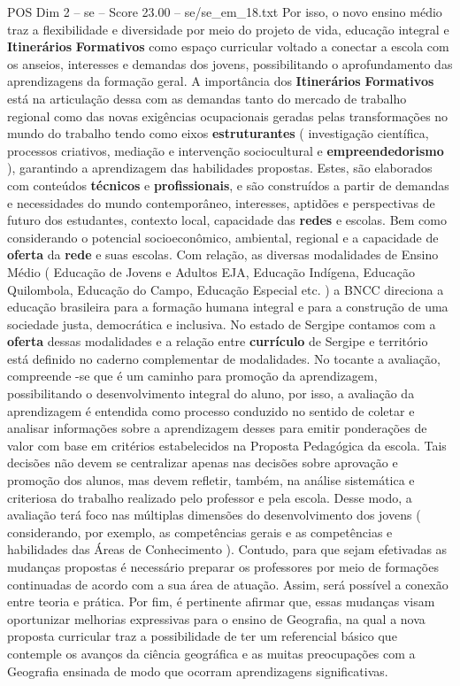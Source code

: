 \begin{textsample}{POS Dim 2 – se – Score 23.00 – se/se\_em\_18.txt}
Por isso, o novo ensino médio traz a flexibilidade e diversidade por meio do projeto de vida, educação integral e \textbf{Itinerários} \textbf{Formativos} como espaço curricular voltado a conectar a escola com os anseios, interesses e demandas dos jovens, possibilitando o aprofundamento das aprendizagens da formação geral.
A importância dos \textbf{Itinerários} \textbf{Formativos} está na articulação dessa com as demandas tanto do mercado de trabalho regional como das novas exigências ocupacionais geradas pelas transformações no mundo do trabalho tendo como eixos \textbf{estruturantes} ( investigação científica, processos criativos, mediação e intervenção sociocultural e \textbf{empreendedorismo} ), garantindo a aprendizagem das habilidades propostas.
Estes, são elaborados com conteúdos \textbf{técnicos} e \textbf{profissionais}, e são construídos a partir de demandas e necessidades do mundo contemporâneo, interesses, aptidões e perspectivas de futuro dos estudantes, contexto local, capacidade das \textbf{redes} e escolas.
Bem como considerando o potencial socioeconômico, ambiental, regional e a capacidade de \textbf{oferta} da \textbf{rede} e suas escolas.
Com relação, as diversas modalidades de Ensino Médio ( Educação de Jovens e Adultos EJA, Educação Indígena, Educação Quilombola, Educação do Campo, Educação Especial etc. ) a BNCC direciona a educação brasileira para a formação humana integral e para a construção de uma sociedade justa, democrática e inclusiva.
No estado de Sergipe contamos com a \textbf{oferta} dessas modalidades e a relação entre \textbf{currículo} de Sergipe e território está definido no caderno complementar de modalidades.
No tocante a avaliação, compreende -se que é um caminho para promoção da aprendizagem, possibilitando o desenvolvimento integral do aluno, por isso, a avaliação da aprendizagem é entendida como processo conduzido no sentido de coletar e analisar informações sobre a aprendizagem desses para emitir ponderações de valor com base em critérios estabelecidos na Proposta Pedagógica da escola.
Tais decisões não devem se centralizar apenas nas decisões sobre aprovação e promoção dos alunos, mas devem refletir, também, na análise sistemática e criteriosa do trabalho realizado pelo professor e pela escola.
Desse modo, a avaliação terá foco nas múltiplas dimensões do desenvolvimento dos jovens ( considerando, por exemplo, as competências gerais e as competências e habilidades das Áreas de Conhecimento ).
Contudo, para que sejam efetivadas as mudanças propostas é necessário preparar os professores por meio de formações continuadas de acordo com a sua área de atuação.
Assim, será possível a conexão entre teoria e prática.
Por fim, é pertinente afirmar que, essas mudanças visam oportunizar melhorias expressivas para o ensino de Geografia, na qual a nova proposta curricular traz a possibilidade de ter um referencial básico que contemple os avanços da ciência geográfica e as muitas preocupações com a Geografia ensinada de modo que ocorram aprendizagens significativas.


\end{textsample}
